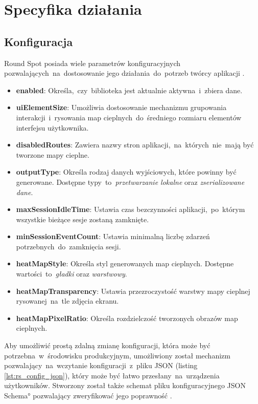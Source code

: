 \section{Specyfika działania}

\subsection{Konfiguracja}
\label{sec:rs_config}
Round Spot posiada wiele parametrów konfiguracyjnych pozwalających~na~dostosowanie jego działania~do~potrzeb twórcy aplikacji \cite{RoundSpot_Config_Docs}.
\begin{itemize}
	\item {\bf enabled}: Określa,~czy~biblioteka jest aktualnie aktywna~i~zbiera dane.
	\item {\bf uiElementSize}: Umożliwia dostosowanie mechanizmu grupowania interakcji~i~rysowania map cieplnych~do~średniego rozmiaru elementów interfejsu użytkownika.
	\item {\bf disabledRoutes}: Zawiera nazwy stron aplikacji,~na~których~nie~mają być tworzone mapy cieplne.
	\item {\bf outputType}: Określa rodzaj danych wyjściowych, które powinny być generowane. Dostępne typy~to~{\it przetwarzanie lokalne} oraz {\it zserializowane dane}.
	\item {\bf maxSessionIdleTime}: Ustawia czas bezczynności aplikacji,~po~którym wszystkie bieżące sesje zostaną zamknięte.
	\item {\bf minSessionEventCount}: Ustawia minimalną liczbę zdarzeń potrzebnych~do~zamknięcia sesji.
	\item {\bf heatMapStyle}: Określa styl generowanych map cieplnych. Dostępne wartości~to~{\it gładki} oraz {\it warstwowy}.
	\item {\bf heatMapTransparency}: Ustawia przezroczystość warstwy mapy cieplnej rysowanej~na~tle zdjęcia ekranu. 
	\item {\bf heatMapPixelRatio}: Określa rozdzielczość tworzonych obrazów map cieplnych.
\end{itemize}

Aby umożliwić prostą zdalną zmianę konfiguracji, która może być potrzebna~w~środowisku produkcyjnym, umożliwiony został mechanizm pozwalający~na~wczytanie konfiguracji~z~pliku JSON (listing \ref{lst:rs_config_json}), który może być łatwo przesłany~na~urządzenia użytkowników. Stworzony został także schemat pliku konfiguracyjnego \ang{JSON Schema} pozwalający zweryfikować jego poprawność \cite{RoundSpot_Config_Schema}.

